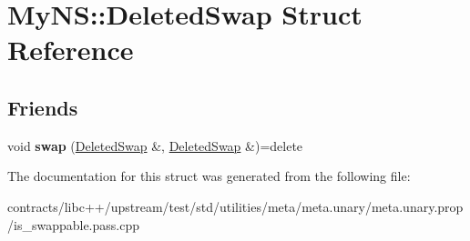 \hypertarget{struct_my_n_s_1_1_deleted_swap}{}\section{My\+NS\+:\+:Deleted\+Swap Struct Reference}
\label{struct_my_n_s_1_1_deleted_swap}
\subsection*{Friends}
\begin{DoxyCompactItemize}
\item 
\mbox{\label{struct_my_n_s_1_1_deleted_swap_a7b7778f363c21439962b960899822541}} 
void {\bfseries swap} (\mbox{\hyperlink{struct_my_n_s_1_1_deleted_swap}{Deleted\+Swap}} \&, \mbox{\hyperlink{struct_my_n_s_1_1_deleted_swap}{Deleted\+Swap}} \&)=delete
\end{DoxyCompactItemize}


The documentation for this struct was generated from the following file\+:\begin{DoxyCompactItemize}
\item 
contracts/libc++/upstream/test/std/utilities/meta/meta.\+unary/meta.\+unary.\+prop/is\+\_\+swappable.\+pass.\+cpp\end{DoxyCompactItemize}
